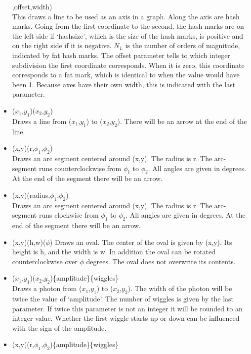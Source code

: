 \begin{itemize}
    ,offset,width) \hfill \\
    This draws a line to be used as an axis in a graph. Along the axis 
    are hash marks. Going from the first coordinate to the second, the 
    hash marks are on the left side if `hashsize', which is the size of the 
    hash marks, is positive and on the right side if it is negative. 
    $N_L$ is the number of orders of magnitude, indicated by fat 
    hash marks. The offset parameter tells to which integer subdivision 
    the first coordinate corresponds. When it is zero, this coordinate 
    corresponds to a fat mark, which is identical to when the value 
    would have been 1. Because axes have their own width, this is 
    indicated with the last parameter.
\item {}($x_1$,$y_1$)($x_2$,$y_2$) \hfill \\
    Draws a line from ($x_1$,$y_1$) to ($x_2$,$y_2$). There will be an 
    arrow at the end of the line.
\item {}(x,y)(r,$\phi_1$,$\phi_2$) \hfill \\
    Draws an arc segment centered around (x,y). The radius is r. The 
    arc-segment runs counterclockwise from $\phi_1$ to $\phi_2$. All 
    angles are given in degrees. At the end of the segment there will 
    be an arrow.
\item {}(x,y)(radius,$\phi_1$,$\phi_2$) \hfill \\
    Draws an arc segment centered around (x,y). The radius is r. The 
    arc-segment runs clockwise from $\phi_1$ to $\phi_2$. All 
    angles are given in degrees. At the end of the segment there will 
    be an arrow.
\item {}(x,y)(h,w)($\phi$) Draws an oval.
    The center of the oval 
    is given by (x,y). Its height is h, and the width is w. In addition 
    the oval can be rotated counterclockwise over $\phi$ degrees. The 
    oval does not overwrite its contents.
\item {}($x_1$,$y_1$)($x_2$,$y_2$)\{amplitude\}\{wiggles\} \hfill \\
    Draws a photon from ($x_1$,$y_1$) to ($x_2$,$y_2$). The width of the 
    photon will be twice the value of `amplitude'. The number of wiggles 
    is given by the last parameter. If twice this parameter is not an integer 
    it will be rounded to an integer value. Whether the first wiggle 
    starts up or down can be influenced with the sign of the amplitude.
\item {}(x,y)(r,$\phi_1$,$\phi_2$)\{amplitude\}\{wiggles\} \hfill \\

\end{itemize}
